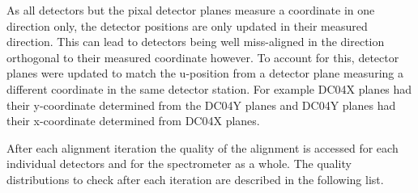 As all detectors but the pixal detector planes measure a coordinate in one
direction only, the detector positions are only updated in their measured
direction.  This can lead to detectors being well miss-aligned in the direction
orthogonal to their measured coordinate however.  To account for this, detector
planes were updated to match the u-position from a detector plane measuring a
different coordinate in the same detector station.  For example DC04X planes had
their y-coordinate determined from the DC04Y planes and DC04Y planes had their
x-coordinate determined from DC04X planes.

After each alignment iteration the quality of the alignment is accessed for each
individual detectors and for the spectrometer as a whole.  The quality
distributions to check after each iteration are described in the following list.

